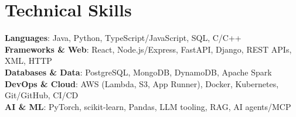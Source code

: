 \documentclass[letterpaper,10pt]{article}
\begin{document}
\section{Technical Skills}
 \begin{itemize}[leftmargin=0.15in, label={}]
    \small{\item{
     \textbf{Languages}{: Java, Python, TypeScript/JavaScript, SQL, C/C++} \\
     \textbf{Frameworks \& Web}{: React, Node.js/Express, FastAPI, Django, REST APIs, XML, HTTP} \\
     \textbf{Databases \& Data}{: PostgreSQL, MongoDB, DynamoDB, Apache Spark} \\
     \textbf{DevOps \& Cloud}{: AWS (Lambda, S3, App Runner), Docker, Kubernetes, Git/GitHub, CI/CD} \\
     \textbf{AI \& ML}{: PyTorch, scikit-learn, Pandas, LLM tooling, RAG, AI agents/MCP} \\
    }}
 \end{itemize}


\end{document}
